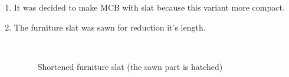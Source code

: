 \begin{enumerate}
\begin{enumerate}
\begin{enumerate}
      \end{enumerate}
      \item It was decided to make MCB with slat because this variant more compact.
      
      \item The furniture slat was sawn for reduction it's length.
      
      \begin{figure}[H]
      	\begin{minipage}[h]{0.2\linewidth}
      		\center   
      	\end{minipage}
      	\begin{minipage}[h]{0.6\linewidth}
      		\caption{Shortened furniture slat \newline (the sawn part is hatched)}
      	\end{minipage}
      \end{figure}
      

\end{enumerate}
\end{enumerate}
